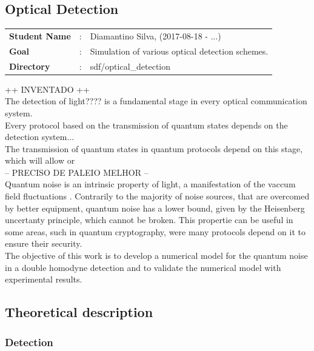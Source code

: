 \begin{bibunit}[plain]

\clearpage
\section{Optical Detection}

\begin{tcolorbox}	
\begin{tabular}{p{2.75cm} p{0.2cm} p{10.5cm}}
\textbf{Student Name}  &:& Diamantino Silva, (2017-08-18 - ...)\\
\textbf{Goal}          &:& Simulation of various optical detection schemes.\\
\textbf{Directory}     &:& sdf/optical\_detection
\end{tabular}
\end{tcolorbox}
%
\vspace{2em}
%
++ INVENTADO ++\\
The detection of light???? is a fundamental stage in every optical communication system.\\
Every protocol based on the transmission of quantum states depends on the detection system...\\
The transmission of quantum states in quantum protocols depend on this stage, which will allow or\\
-- PRECISO DE PALEIO MELHOR --\\
Quantum noise is an intrinsic property of light, a manifestation of the vaccum field fluctuations
\cite{fox2006}.
Contrarily to the majority of noise sources, that are overcomed by better equipment, quantum noise has a lower bound, given by the Heisenberg uncertanty principle, which cannot be broken. This propertie can be useful in some areas, such in quantum cryptography, were many protocols depend on it to ensure their security.\\
The objective of this work is to develop a numerical model for the quantum noise in a double homodyne detection and to validate the numerical model with experimental results.\\


\subsection{Theoretical description}\label{sec:intro}

\subsubsection{Detection}



\end{bibunit}
